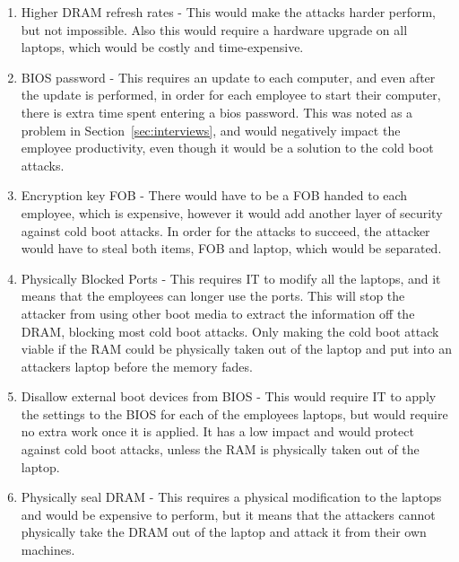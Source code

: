\documentclass[paper=a4, fontsize=11pt]{scrartcl} %
\numberwithin{equation}{section} %
\numberwithin{figure}{section} %
\numberwithin{table}{section} %
\begin{document}
	\begin{enumerate}
		\item Higher DRAM refresh rates  - This would make the attacks harder perform, but not impossible.  Also this would require a hardware upgrade on all laptops, which would be costly and time-expensive.
		\item BIOS password - This requires an update to each computer, and even after the update is performed, in order for each employee to start their computer, there is extra time spent entering a bios password.  This was noted as a problem in Section~\ref{sec:interviews}, and would negatively impact the employee productivity, even though it would be a solution to the cold boot attacks.
		\item Encryption key FOB - There would have to be a FOB handed to each employee, which is expensive, however it would add another layer of security against cold boot attacks.  In order for the attacks to succeed, the attacker would have to steal both items, FOB and laptop, which would be separated. 
		\item Physically Blocked Ports -  This requires IT to modify all the laptops, and it means that the employees can longer use the ports.  This will stop the attacker from using other boot media to extract the information off the DRAM, blocking most cold boot attacks.  Only making the cold boot attack viable if the RAM could be physically taken out of the laptop and put into an attackers laptop before the memory fades. 
		\item Disallow external boot devices from BIOS - This would require IT to apply the settings to the BIOS for each of the employees laptops, but would require no extra work once it is applied.  It has a low impact and would protect against cold boot attacks, unless the RAM is physically taken out of the laptop.
		\item Physically seal DRAM - This requires a physical modification to the laptops and would be expensive to perform, but it means that the attackers cannot physically take the DRAM out of the laptop and attack it from their own machines.
	\end{enumerate}
		
\end{document}
